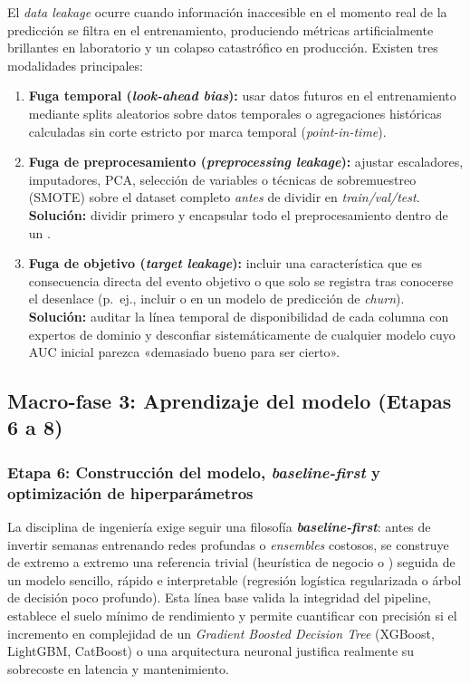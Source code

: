 \begin{warningbox}
El \textit{data leakage} ocurre cuando información inaccesible en el momento real de la predicción se filtra en el entrenamiento, produciendo métricas artificialmente brillantes en laboratorio y un colapso catastrófico en producción. Existen tres modalidades principales:
\begin{enumerate}
  \item \textbf{Fuga temporal (\textit{look-ahead bias}):} usar datos futuros en el entrenamiento mediante splits aleatorios sobre datos temporales o agregaciones históricas calculadas sin corte estricto por marca temporal (\textit{point-in-time}).
  \item \textbf{Fuga de preprocesamiento (\textit{preprocessing leakage}):} ajustar escaladores, imputadores, PCA, selección de variables o técnicas de sobremuestreo (SMOTE) sobre el dataset completo \textit{antes} de dividir en \textit{train/val/test}. \textbf{Solución:} dividir primero y encapsular todo el preprocesamiento dentro de un .
  \item \textbf{Fuga de objetivo (\textit{target leakage}):} incluir una característica que es consecuencia directa del evento objetivo o que solo se registra tras conocerse el desenlace (p.~ej., incluir  o  en un modelo de predicción de \textit{churn}). \textbf{Solución:} auditar la línea temporal de disponibilidad de cada columna con expertos de dominio y desconfiar sistemáticamente de cualquier modelo cuyo AUC inicial parezca «demasiado bueno para ser cierto».
\end{enumerate}
\end{warningbox}

\subsection{Macro-fase 3: Aprendizaje del modelo (Etapas 6 a 8)}

\subsubsection{Etapa 6: Construcción del modelo, \textit{baseline-first} y optimización de hiperparámetros}

La disciplina de ingeniería exige seguir una filosofía \textbf{\textit{baseline-first}}: antes de invertir semanas entrenando redes profundas o \textit{ensembles} costosos, se construye de extremo a extremo una referencia trivial (heurística de negocio o ) seguida de un modelo sencillo, rápido e interpretable (regresión logística regularizada o árbol de decisión poco profundo). Esta línea base valida la integridad del pipeline, establece el suelo mínimo de rendimiento y permite cuantificar con precisión si el incremento en complejidad de un \textit{Gradient Boosted Decision Tree} (XGBoost, LightGBM, CatBoost) o una arquitectura neuronal justifica realmente su sobrecoste en latencia y mantenimiento.

